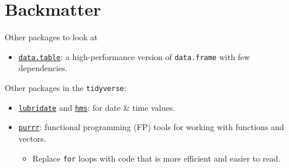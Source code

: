 \documentclass[
  11pt,
  ignorenonframetext,
]{beamer}
\providecommand{\tightlist}{%
  \setlength{\itemsep}{0pt}\setlength{\parskip}{0pt}}
\begin{document}
\hypertarget{backmatter}{%
\section{Backmatter}\label{backmatter}}

\begin{frame}[fragile]{Other packages to look at}
\protect\hypertarget{other-packages-to-look-at}{}
\begin{itemize}
\tightlist
\item
  \href{https://rdatatable.gitlab.io/data.table/}{\texttt{data.table}}:
  a high-performance version of \texttt{data.frame} with few
  dependencies.
\end{itemize}

Other packages in the \texttt{tidyverse}:

\begin{itemize}
\item
  \href{https://lubridate.tidyverse.org/}{\texttt{lubridate}} and
  \href{https://hms.tidyverse.org/}{\texttt{hms}}: for date \& time
  values.
\item
  \href{https://purrr.tidyverse.org/}{\texttt{purrr}}: functional
  programming (FP) tools for working with functions and vectors.

  \begin{itemize}
  \tightlist
  \item
    Replace \texttt{for} loops with code that is more efficient and
    easier to read.
  \end{itemize}
\end{itemize}
\end{frame}
\end{document}
